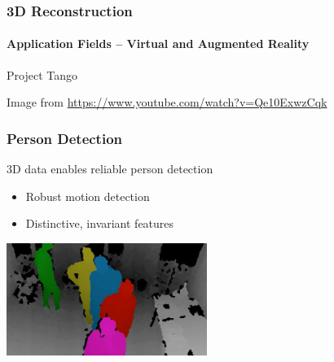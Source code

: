 \documentclass[xetex,professionalfont]{beamer}
\begin{document}
\begin{frame}
\frametitle{3D Reconstruction}
\framesubtitle{Application Fields -- Virtual and Augmented Reality}

Project Tango

\bigskip
\begin{center}
    {\centering Image from \url{https://www.youtube.com/watch?v=Qe10ExwzCqk}}
\end{center}

\end{frame}


\begin{frame}
\frametitle{Person Detection}

3D data enables reliable person detection
\begin{itemize}
    \item Robust motion detection
	\item Distinctive, invariant features %
\end{itemize}

\begin{center}
\includegraphics[width=6.5cm]{figures/person-detection.jpg}
\end{center}

\end{frame}

\end{document}
